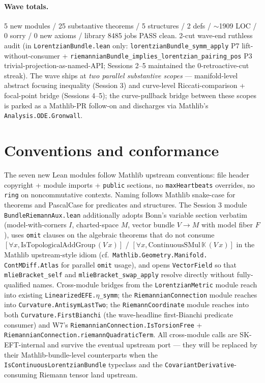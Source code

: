 \documentclass[twocolumn]{revtex4-2}
\begin{document}
\paragraph{Wave totals.} 5 new modules / 25 substantive theorems /
5 structures / 2 defs / $\sim$1909 LOC / 0 sorry / 0 new axioms /
library 8485 jobs PASS clean. 2-cut wave-end ruthless audit (in
\texttt{LorentzianBundle.lean} only: \texttt{lorentzianBundle\_symm\_apply}
P7 lift-without-consumer + \texttt{riemannianBundle\_implies\_lorentzian\_pairing\_pos}
P3 trivial-projection-as-named-API; Sessions 2--5 maintained the
0-retroactive-cut streak). The wave ships at \emph{two parallel
substantive scopes} --- manifold-level abstract focusing inequality
(Session 3) and curve-level Riccati-comparison + focal-point bridge
(Sessions 4--5); the curve-pullback bridge between these scopes is
parked as a Mathlib-PR follow-on and discharges via Mathlib's
\texttt{Analysis.ODE.Gronwall}.

\section{Conventions and conformance}\label{sec:conventions}

The seven new Lean modules follow Mathlib upstream conventions: file
header copyright + module imports + \texttt{public} sections, no
\texttt{maxHeartbeats} overrides, no \texttt{ring} on noncommutative
contexts. Naming follows Mathlib snake-case for theorems and
PascalCase for predicates and structures. The Session 3 module
\texttt{BundleRiemannAux.lean} additionally adopts Bonn's variable
section verbatim (model-with-corners $I$, charted-space $M$, vector
bundle $V \to M$ with model fiber $F$), uses \texttt{omit} clauses on
the algebraic theorems that do not consume
$[\forall x, \mathrm{IsTopologicalAddGroup}\,(V\,x)]$ /
$[\forall x, \mathrm{ContinuousSMul}\,\mathbb{K}\,(V\,x)]$ in the
Mathlib upstream-style idiom (cf.\ \texttt{Mathlib.Geometry.Manifold.\-
ContMDiff.Atlas} for parallel \texttt{omit} usage), and opens
\texttt{VectorField} so that \texttt{mlieBracket\_self} and
\texttt{mlieBracket\_swap\_apply} resolve directly without
fully-qualified names. Cross-module bridges from
the \texttt{LorentzianMetric} module reach into existing
\texttt{LinearizedEFE.$\eta$\_symm}; the
\texttt{RiemannianConnection} module reaches into
\texttt{Curvature.AntisymLastTwo}; the
\texttt{RiemannCoordinate} module reaches into both
\texttt{Curvature.FirstBianchi} (the wave-headline first-Bianchi
predicate consumer) and W7's
\texttt{RiemannianConnection.IsTorsionFree} +
\texttt{RiemannianConnection.riemannQuadraticTerm}. All cross-module
calls are SK-EFT-internal and survive the eventual upstream port —
they will be replaced by their Mathlib-bundle-level counterparts when
the \texttt{IsContinuousLorentzianBundle} typeclass and the
\texttt{CovariantDerivative}-consuming Riemann tensor land upstream.
\end{document}
